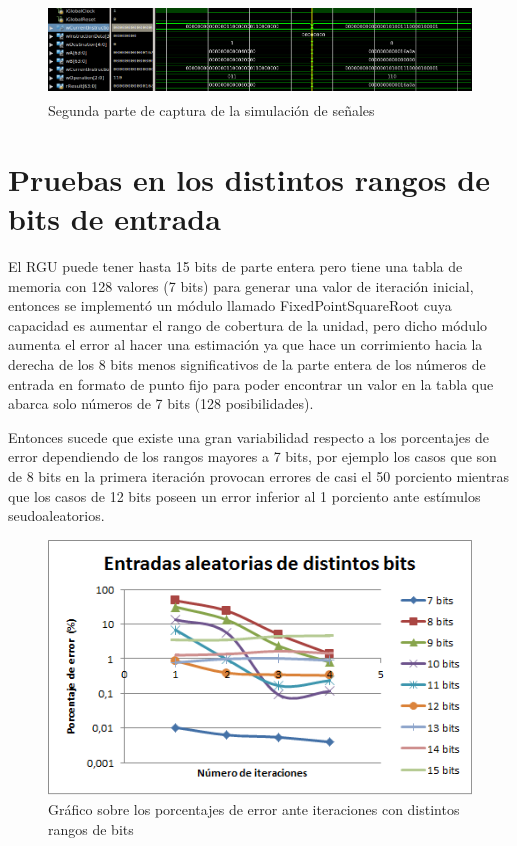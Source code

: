 \begin{figure}
	\includegraphics[width=1\linewidth, height=2.5cm]{images/Selection_011}
	\caption{Segunda parte de captura de la simulación de señales} \label{fig:sim2}
\end{figure}

\section{Pruebas en los distintos rangos de bits de entrada}

El  RGU puede tener hasta 15 bits de parte entera pero tiene una tabla de memoria con 128 valores (7 bits) para generar una valor de iteración inicial, entonces se implementó un módulo llamado FixedPointSquareRoot cuya capacidad es aumentar el rango de cobertura de la unidad, pero dicho módulo aumenta el error al hacer una estimación ya que hace un corrimiento hacia la derecha de los 8 bits menos significativos de la parte entera de los números de entrada en formato de punto fijo para poder encontrar un valor en la tabla que abarca solo números de 7 bits (128 posibilidades).

Entonces sucede que existe una gran variabilidad respecto a los porcentajes de error dependiendo de los rangos mayores a 7 bits, por ejemplo los casos que son de 8 bits en la primera iteración provocan errores de casi el 50 porciento mientras que los casos de 12 bits poseen un error inferior al 1 porciento ante estímulos seudoaleatorios.

\begin{figure}
	\includegraphics[width=0.7\linewidth]{images/puntos}
	\caption{Gráfico sobre los porcentajes de error ante iteraciones con distintos rangos de bits} \label{fig:puntos}
\end{figure}

